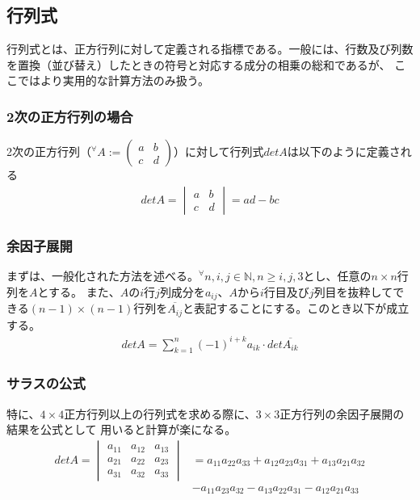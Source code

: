 \documentclass[10pt]{ujarticle}
\begin{document}
\subsection{行列式}
行列式とは、正方行列に対して定義される指標である。一般には、行数及び列数を置換（並び替え）したときの符号と対応する成分の相乗の総和であるが、
ここではより実用的な計算方法のみ扱う。

\subsubsection{2次の正方行列の場合}
2次の正方行列（$^\forall A:=(\begin{smallmatrix}a&b\\c&d\end{smallmatrix})$）に対して行列式$detA$は以下のように定義される
$$
\begin{aligned}
  detA=\begin{vmatrix} a & b\\ c & d \end{vmatrix}=ad-bc
\end{aligned}
$$
\subsubsection{余因子展開}
まずは、一般化された方法を述べる。$^\forall n,i,j\in\mathbb{N},n\geq i,j,3$とし、任意の$n\times n$行列を$A$とする。
また、$A$の$i$行$j$列成分を$a_{ij}$、$A$から$i$行目及び$j$列目を抜粋してできる$(n-1)\times(n-1)$行列を$\overline{A_{ij}}$と表記することにする。このとき以下が成立する。
$$
\begin{aligned}
  detA=\sum_{k=1}^{n}(-1)^{i+k}a_{ik}\cdot det\overline{A_{ik}}
\end{aligned}
$$

\subsubsection{サラスの公式}
特に、$4\times 4$正方行列以上の行列式を求める際に、$3\times 3$正方行列の余因子展開の結果を公式として
用いると計算が楽になる。
$$
\begin{aligned}
  detA=\begin{vmatrix}
    a_{11} & a_{12} & a_{13}\\
    a_{21} & a_{22} & a_{23}\\
    a_{31} & a_{32} & a_{33}
  \end{vmatrix}&=a_{11}a_{22}a_{33}+a_{12}a_{23}a_{31}+a_{13}a_{21}a_{32}\\
  &-a_{11}a_{23}a_{32}-a_{13}a_{22}a_{31}-a_{12}a_{21}a_{33}
\end{aligned}
$$
\end{document}
